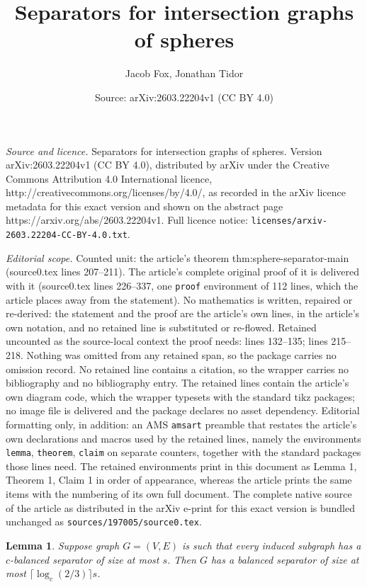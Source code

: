 \documentclass[10pt,a4paper]{amsart}
\title{Separators for intersection graphs of spheres}
\author{Jacob Fox, Jonathan Tidor}
\date{Source: arXiv:2603.22204v1 (CC BY 4.0)}
\newtheorem{lemma}{Lemma}
\begin{document}
\maketitle

\noindent\emph{Source and licence.} Separators for intersection graphs of spheres. Version arXiv:2603.22204v1 (CC BY 4.0), distributed by arXiv under the Creative Commons Attribution 4.0 International licence, http://creativecommons.org/licenses/by/4.0/, as recorded in the arXiv licence metadata for this exact version and shown on the abstract page https://arxiv.org/abs/2603.22204v1. Full licence notice: \texttt{licenses/arxiv-2603.22204-CC-BY-4.0.txt}.\par\smallskip

\noindent\textit{Editorial scope.} Counted unit: the article's theorem thm:sphere-separator-main (source0.tex lines 207--211). The article's complete original proof of it is delivered with it (source0.tex lines 226--337, one \texttt{proof} environment of 112 lines, which the article places away from the statement). No mathematics is written, repaired or re-derived: the statement and the proof are the article's own lines, in the article's own notation, and no retained line is substituted or re-flowed.  Retained uncounted as the source-local context the proof needs: lines 132--135; lines 215--218.  Nothing was omitted from any retained span, so the package carries no omission record.  No retained line contains a citation, so the wrapper carries no bibliography and no bibliography entry.  The retained lines contain the article's own diagram code, which the wrapper typesets with the standard tikz packages; no image file is delivered and the package declares no asset dependency.  Editorial formatting only, in addition: an AMS \texttt{amsart} preamble that restates the article's own declarations and macros used by the retained lines, namely the environments \texttt{lemma}, \texttt{theorem}, \texttt{claim} on separate counters, together with the standard packages those lines need.  The retained environments print in this document as Lemma 1, Theorem 1, Claim 1 in order of appearance, whereas the article prints the same items with the numbering of its own full document.  The complete native source of the article as distributed in the arXiv e-print for this exact version is bundled unchanged as \texttt{sources/197005/source0.tex}.
\begin{lemma}
\label{lem:balancing-separators}
Suppose graph $G=(V,E)$ is such that every induced subgraph has a $c$-balanced separator of size at most $s$. Then $G$ has a balanced separator of size at most $\lceil \log_c(2/3)\rceil s$.
\end{lemma}
\end{document}
